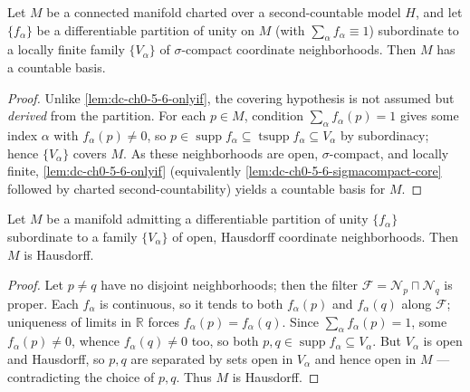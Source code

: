 \begin{lemma}
  \label{lem:dc-ch0-5-6-onlyif-pou}
  \leanok
  Let $M$ be a connected manifold charted over a second-countable model $H$, and let
  $\{f_\alpha\}$ be a differentiable partition of unity on $M$ (with $\sum_\alpha f_\alpha
  \equiv 1$) subordinate to a locally finite family $\{V_\alpha\}$ of $\sigma$-compact
  coordinate neighborhoods. Then $M$ has a countable basis.
\end{lemma}
\begin{proof}
  \sketch
  \leanok
  Unlike \cref{lem:dc-ch0-5-6-onlyif}, the covering hypothesis is not assumed but
  \emph{derived} from the partition. For each $p\in M$, condition $\sum_\alpha f_\alpha(p)=1$
  gives some index $\alpha$ with $f_\alpha(p)\neq0$, so $p\in\operatorname{supp}f_\alpha
  \subseteq\operatorname{tsupp}f_\alpha\subseteq V_\alpha$ by subordinacy; hence
  $\{V_\alpha\}$ covers $M$. As these neighborhoods are open, $\sigma$-compact, and locally
  finite, \cref{lem:dc-ch0-5-6-onlyif} (equivalently
  \cref{lem:dc-ch0-5-6-sigmacompact-core} followed by charted second-countability) yields a
  countable basis for $M$.
\end{proof}

\begin{lemma}
  \label{lem:dc-ch0-5-6-hausdorff}
  \leanok
  Let $M$ be a manifold admitting a differentiable partition of unity $\{f_\alpha\}$
  subordinate to a family $\{V_\alpha\}$ of open, Hausdorff coordinate neighborhoods. Then
  $M$ is Hausdorff.
\end{lemma}
\begin{proof}
  \sketch
  \leanok
  Let $p\neq q$ have no disjoint neighborhoods; then the filter $\mathcal F=\mathcal N_p
  \sqcap\mathcal N_q$ is proper. Each $f_\alpha$ is continuous, so it tends to both
  $f_\alpha(p)$ and $f_\alpha(q)$ along $\mathcal F$; uniqueness of limits in $\mathbb R$
  forces $f_\alpha(p)=f_\alpha(q)$. Since $\sum_\alpha f_\alpha(p)=1$, some $f_\alpha(p)\neq
  0$, whence $f_\alpha(q)\neq0$ too, so both $p,q\in\operatorname{supp}f_\alpha\subseteq
  V_\alpha$. But $V_\alpha$ is open and Hausdorff, so $p,q$ are separated by sets open in
  $V_\alpha$ and hence open in $M$ — contradicting the choice of $p,q$. Thus $M$ is
  Hausdorff.
\end{proof}

